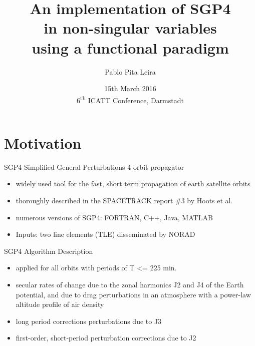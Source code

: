 \documentclass[10pt, compress, xcolor={usenames,dvipsnames}]{beamer}
\title{An implementation of SGP4  \\
in non-singular variables  \\
using a functional paradigm}
\author{Pablo Pita Leira}
\date{%
  \small 15th March 2016\\[2em]
  6\textsuperscript{th} ICATT Conference, Darmstadt}
\newcommand{\SmallArrow}{\ding{228}}
\begin{document}
\begin{frame}
  \titlepage
\end{frame}


\section{Motivation}

\begin{frame}[fragile]{SGP4}
Simplified General Perturbations 4 orbit propagator

\begin{itemize}[label=\SmallArrow]
\item  widely used tool for the fast, short term propagation of earth satellite orbits
\item  thoroughly described in the SPACETRACK report \#3 by Hoots et al.
\item  numerous versions of SGP4: FORTRAN, C++, Java, MATLAB
\item  Inputs: two line elements (TLE) disseminated by NORAD
\end{itemize}


\end{frame}

\begin{frame}[fragile]{SGP4 Algorithm Description}

\begin{itemize}[label=\SmallArrow]
\item applied for all orbits with periods of T <= 225 min.
\item secular rates of change due to the zonal harmonics J2 and J4 of the Earth potential,
 and due to drag perturbations in an atmosphere with a power-law altitude profile of air density
\item long period corrections perturbations due to J3
\item first-order, short-period perturbation corrections due to J2
\end{itemize}


\end{frame}
\end{document}
